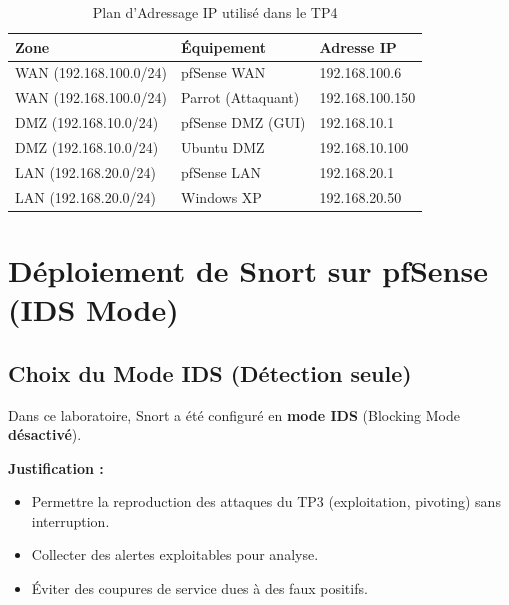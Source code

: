 \documentclass[12pt,a4paper,openany]{report}
\newcommand{\tableheadcolor}{\rowcolor{tableheadbg}}
\begin{document}
	\begin{table}[H]
		\centering
		\renewcommand{\arraystretch}{1.4}
		\setlength{\arrayrulewidth}{0.5pt}
		\begin{tabular}{p{4cm} p{4cm} p{6cm}}
			\arrayrulecolor{tableborder}
			\hline
			\tableheadcolor
			\textcolor{tableheadfg}{\textbf{Zone}} &
			\textcolor{tableheadfg}{\textbf{Équipement}} &
			\textcolor{tableheadfg}{\textbf{Adresse IP}} \\
			\hline
			\rowcolor{tablerowalt}
			WAN (192.168.100.0/24) & pfSense WAN & 192.168.100.6 \\
			WAN (192.168.100.0/24) & Parrot (Attaquant) & 192.168.100.150 \\
			\rowcolor{tablerowalt}
			DMZ (192.168.10.0/24) & pfSense DMZ (GUI) & 192.168.10.1 \\
			DMZ (192.168.10.0/24) & Ubuntu DMZ & 192.168.10.100 \\
			\rowcolor{tablerowalt}
			LAN (192.168.20.0/24) & pfSense LAN & 192.168.20.1 \\
			LAN (192.168.20.0/24) & Windows XP & 192.168.20.50 \\
			\hline
		\end{tabular}
		\caption{Plan d'Adressage IP utilisé dans le TP4}
		\label{tab:ip-plan-tp4}
	\end{table}
	
	\chapter{Déploiement de Snort sur pfSense (IDS Mode)}
	
	\section{Choix du Mode IDS (Détection seule)}
	
	\begin{tcolorbox}[colback=secondary!5!white, colframe=secondary, title=\textbf{Choix de conception : IDS Mode}]
		Dans ce laboratoire, Snort a été configuré en \textbf{mode IDS} (Blocking Mode \textbf{désactivé}).  
		
		\textbf{Justification :}
		\begin{itemize}
			\item Permettre la reproduction des attaques du TP3 (exploitation, pivoting) sans interruption.
			\item Collecter des alertes exploitables pour analyse.
			\item Éviter des coupures de service dues à des faux positifs.
		\end{itemize}
	\end{tcolorbox}
	
\end{document}
